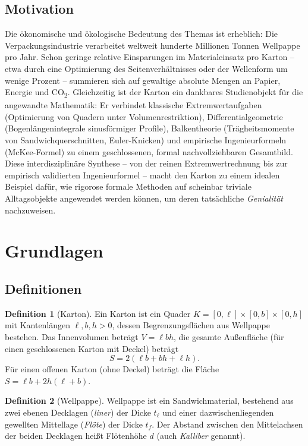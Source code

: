 ﻿\documentclass[a4paper,12pt]{article}
\theoremstyle{definition}
\newtheorem{definition}{Definition}
\begin{document}
\subsection{Motivation}

Die ökonomische und ökologische Bedeutung des Themas ist erheblich: Die
Verpackungsindustrie verarbeitet weltweit hunderte Millionen Tonnen Wellpappe pro Jahr.
Schon geringe relative Einsparungen im Materialeinsatz pro Karton -- etwa durch eine
Optimierung des Seitenverhältnisses oder der Wellenform um wenige Prozent -- summieren
sich auf gewaltige absolute Mengen an Papier, Energie und CO\textsubscript{2}.
Gleichzeitig ist der Karton ein dankbares Studienobjekt für die angewandte Mathematik:
Er verbindet klassische Extremwertaufgaben (Optimierung von Quadern unter
Volumenrestriktion), Differentialgeometrie (Bogenlängenintegrale sinusförmiger Profile),
Balkentheorie (Trägheitsmomente von Sandwich\-querschnitten, Euler-Knicken) und
empirische Ingenieurformeln (McKee-Formel) zu einem geschlossenen, formal
nachvollziehbaren Gesamtbild. Diese interdisziplinäre Synthese -- von der reinen
Extremwertrechnung bis zur empirisch validierten Ingenieurformel -- macht den Karton zu
einem idealen Beispiel dafür, wie rigorose formale Methoden auf scheinbar triviale
Alltagsobjekte angewendet werden können, um deren tatsächliche \emph{Genialität}
nachzuweisen.

\section{Grundlagen}

\subsection{Definitionen}

\begin{definition}[Karton]
	Ein Karton ist ein Quader $K = [0,\ell] \times [0,b] \times [0,h]$ mit
	Kantenlängen $\ell, b, h > 0$, dessen Begrenzungsflächen aus Wellpappe bestehen.
	Das Innenvolumen beträgt $V = \ell b h$, die gesamte Außenfläche (für einen
	geschlossenen Karton mit Deckel) beträgt
	\[
		S = 2(\ell b + b h + \ell h).
	\]
	Für einen offenen Karton (ohne Deckel) beträgt die Fläche
	$S = \ell b + 2h(\ell + b)$.
\end{definition}

\begin{definition}[Wellpappe]
	Wellpappe ist ein Sandwichmaterial, bestehend aus zwei ebenen Decklagen
	(\emph{liner}) der Dicke $t_\ell$ und einer dazwischenliegenden gewellten
	Mittellage (\emph{Flöte}) der Dicke $t_f$. Der Abstand zwischen den
	Mittelachsen der beiden Decklagen heißt Flötenhöhe $d$ (auch
	\emph{Kalliber} genannt).
\end{definition}
\end{document}

